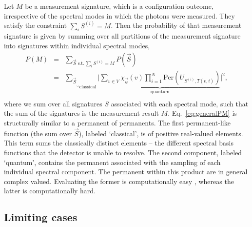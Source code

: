 \documentclass[aps,pra,twocolumn,amsmath,amssymb,nofootinbib,superscriptaddress]{revtex4}
\begin{document}
Let $M$ be a measurement signature, which is a configuration outcome, irrespective of the spectral modes in which the photons were measured. They satisfy the constraint $\sum_i S^{(i)} = M$. Then the probability of that measurement signature is given by summing over all partitions of the measurement signature into signatures within individual spectral modes,
\begin{eqnarray} \label{eq:generalPM}
P(M) &=& \sum_{\vec{S}\,\,\mathrm{s.t.}\,\sum_i S^{(i)} = M} P(\vec{S}) \nonumber \\
&=& \underbrace{\sum_{\vec{S}}}_{\mathrm{classical}} \Bigg| \underbrace{\sum_{v\in V} \chi_{\vec\psi}(v) \prod_{i=1}^N \mathrm{Per}\left(U_{S^{(i)},T(v,i)}\right)}_{\mathrm{quantum}}\Bigg|^2,\nonumber \\
\end{eqnarray}
where we sum over all signatures $S$ associated with each spectral mode, such that the sum of the signatures is the measurement result $M$. Eq.~\ref{eq:generalPM} is structurally similar to a permanent of permanents. The first permanent-like function (the sum over $\vec{S}$), labeled `classical', is of positive real-valued elements. This term sums the classically distinct elements -- the different spectral basis functions that the detector is unable to resolve. The second component, labeled `quantum', contains the permanent associated with the sampling of each individual spectral component. The permanent within this product are in general complex valued. Evaluating the former is computationally easy \cite{bib:SinclairPerm}, whereas the latter is computationally hard. 

%
%

\subsection{Limiting cases}
\end{document}
